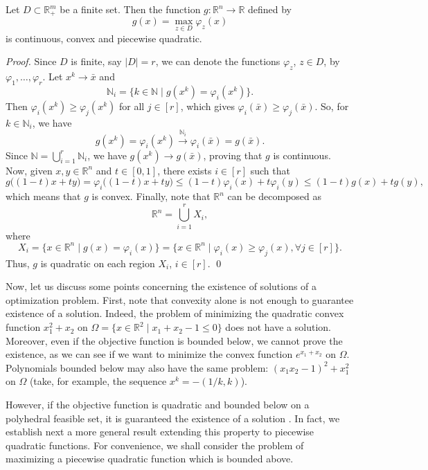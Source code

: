 \documentclass[smallextended,referee,envcountsect]{svjour3}
\newcommand{\R}{\mathbb{R}}
\newcommand{\N}{\mathbb{N}}
\begin{document}
\begin{lemma}
\label{lm:max_gmzgm}
Let $D\subset\R_+^m$ be a finite set. Then the function $g:\R^n\to\R$ defined by 
\begin{equation}
\label{fc_max_gmzgm}
g(x)=\max_{z\in D}\varphi_z(x)
\end{equation}
is continuous, convex and piecewise quadratic. 
\end{lemma}
\begin{proof}
Since $D$ is finite, say $|D|=r$, we can denote the functions $\varphi_z$, $z\in D$, 
by $\varphi_1,\ldots,\varphi_r$. Let $x^k\to\bar{x}$ and 
$$
\N_i=\{k\in\N\mid g(x^k)=\varphi_i(x^k)\}.
$$
Then $\varphi_i(x^k)\geq\varphi_j(x^k)$ for all $j\in[r]$, which gives 
$\varphi_i(\bar{x})\geq\varphi_j(\bar{x})$. So, for $k\in\N_i$, we have 
$$
g(x^k)=\varphi_i(x^k)\stackrel{\N_i}{\to}\varphi_i(\bar{x})=g(\bar{x}).
$$
Since $\N=\displaystyle\bigcup_{i=1}^{r}\N_i$, we have $g(x^k)\to g(\bar{x})$, proving 
that $g$ is continuous. Now, given $x, y\in\R^n$ and $t\in[0,1]$, there exists 
$i\in[r]$ such that  
$$
g\big((1-t)x+ty\big)=\varphi_i\big((1-t)x+ty\big)\leq(1-t)\varphi_i(x)+t\varphi_i(y)
\leq(1-t)g(x)+tg(y),
$$
which means that $g$ is convex. Finally, note that $\R^n$ can be decomposed as 
$$
\R^n=\displaystyle\bigcup_{i=1}^{r}X_i,
$$
where 
$$
X_i=\{x\in\R^n\mid g(x)=\varphi_i(x)\}=
\{x\in\R^n\mid \varphi_i(x)\geq\varphi_j(x), \forall j\in[r]\}.
$$
Thus, $g$ is quadratic on each region $X_i$, $i\in[r]$.
\qed\end{proof}

Now, let us discuss some points concerning the existence of solutions of a optimization 
problem. First, note that convexity alone is not enough to guarantee existence of a 
solution. Indeed, the problem of minimizing the quadratic convex function $x_1^2+x_2$ on 
$\Omega=\{x\in\R^2\mid x_1+x_2-1\leq 0\}$ does not have a solution. Moreover, even if the 
objective function is bounded below, we cannot prove the existence, as we can see if we 
want to minimize the convex function $e^{x_1+x_2}$ on $\Omega$. Polynomials bounded below 
may also have the same problem: $(x_1x_2-1)^2+x_1^2$ on $\Omega$ (take, for example, 
the sequence $x^k=-(1/k,k)$).

However, if the objective function is quadratic and bounded below on a polyhedral 
feasible set, it is guaranteed the existence of a solution \cite{BlumOettli72,FrankWolfe56}. 
In fact, we establish next a more general result extending this property to piecewise 
quadratic functions. For convenience, we shall consider the problem of 
maximizing a piecewise quadratic function which is bounded above.
\end{document}
